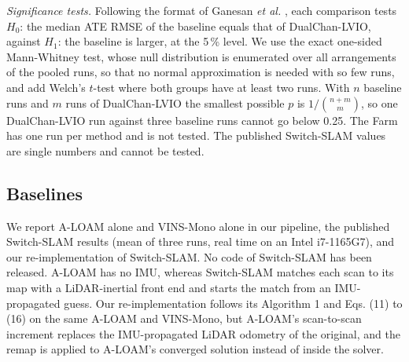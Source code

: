 \documentclass[journal]{IEEEtran}
\begin{document}
\emph{Significance tests.} Following the format of Ganesan \emph{et al.} \cite{ganesan2024}, each comparison tests $H_0$: the median ATE RMSE of the baseline equals that of DualChan-LVIO, against $H_1$: the baseline is larger, at the 5\,\% level. We use the exact one-sided Mann-Whitney test, whose null distribution is enumerated over all arrangements of the pooled runs, so that no normal approximation is needed with so few runs, and add Welch's $t$-test where both groups have at least two runs. With $n$ baseline runs and $m$ runs of DualChan-LVIO the smallest possible $p$ is $1/\binom{n+m}{m}$, so one DualChan-LVIO run against three baseline runs cannot go below 0.25. The Farm has one run per method and is not tested. The published Switch-SLAM values are single numbers and cannot be tested.

\subsection{Baselines}
We report A-LOAM alone and VINS-Mono alone in our pipeline, the published Switch-SLAM results \cite{switchslam2024} (mean of three runs, real time on an Intel i7-1165G7), and our re-implementation of Switch-SLAM. No code of Switch-SLAM has been released. A-LOAM has no IMU, whereas Switch-SLAM matches each scan to its map with a LiDAR-inertial front end and starts the match from an IMU-propagated guess. Our re-implementation follows its Algorithm 1 and Eqs. (11) to (16) on the same A-LOAM and VINS-Mono, but A-LOAM's scan-to-scan increment replaces the IMU-propagated LiDAR odometry of the original, and the remap is applied to A-LOAM's converged solution instead of inside the solver.
\end{document}
